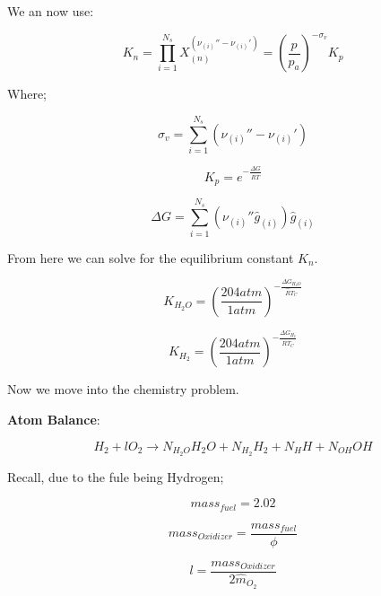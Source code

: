 \documentclass[12pt, Times New Roman]{article}
\begin{document}
    We an now use:

    \begin{equation}
        K_{n} = \prod^{N_{s}}_{i=1} X_{(n)}^{(\nu_{(i)} '' - \nu_{(i)} ')} = (\frac{p}{p_{a}})^{-\sigma_{v}}K_{p}
    \end{equation}

    Where;

    \begin{equation}
        \sigma_{v} = \sum^{N_{s}}_{i=1} (\nu_{(i)} '' - \nu_{(i)} ')
    \end{equation}

    \begin{equation}
        K_{p} = e^{- \frac{\Delta G}{\hat{R}T}}
    \end{equation}

    \begin{equation}
        \Delta G = \sum^{N_{s}}_{i=1} (\nu_{(i)} '' \hat{g}_{(i)}) \hat{g}_{(i)}
    \end{equation}

    From here we can solve for the equilibrium constant $K_{n}$.

    \begin{equation}
        K_{H_{2}O} = (\frac{204 atm}{1 atm})^{-\frac{\Delta G_{H_{2}O}}{\hat{R}T_{C}}}
    \end{equation}

    \begin{equation}
        K_{H_{2}} = (\frac{204 atm}{1 atm})^{-\frac{\Delta G_{H_{2}}}{\hat{R}T_{C}}}
    \end{equation}

    Now we move into the chemistry problem. 

    \textbf{Atom Balance}:

    \begin{equation}
        H_{2} + l O_{2} \rightarrow N_{H_{2}O} H_{2}O + N_{H_{2}} H_{2} + N_{H}H + N_{OH}OH
    \end{equation}

    Recall, due to the fule being Hydrogen;

    \begin{equation}
        mass_{fuel} = 2.02 
    \end{equation}

    \begin{equation}
        mass_{Oxidizer} =  \frac{mass_{fuel}}{\phi}
    \end{equation}

    \begin{equation}
        l = \frac{mass_{Oxidizer}}{2 \hat{m}_{O_{2}}}
    \end{equation}
\end{document}
